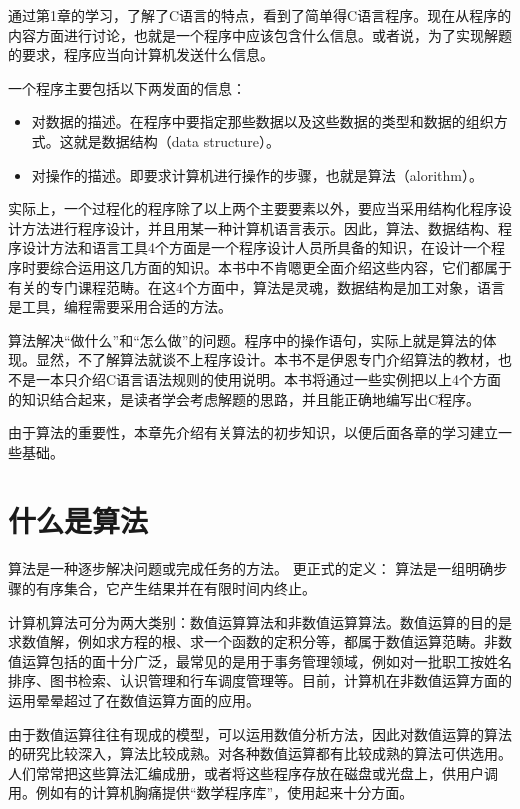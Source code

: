 \begin{lslisting}
\begin{enumerate}
通过第1章的学习，了解了C语言的特点，看到了简单得C语言程序。现在从程序的内容方面进行讨论，也就是一个程序中应该包含什么信息。或者说，为了实现解题的要求，程序应当向计算机发送什么信息。

一个程序主要包括以下两发面的信息：
\begin{itemize}
	\item 对数据的描述。在程序中要指定那些数据以及这些数据的类型和数据的组织方式。这就是数据结构（data structure）。
	\item 对操作的描述。即要求计算机进行操作的步骤，也就是算法（alorithm）。
\end{itemize}

实际上，一个过程化的程序除了以上两个主要要素以外，要应当采用结构化程序设计方法进行程序设计，并且用某一种计算机语言表示。因此，算法、数据结构、程序设计方法和语言工具4个方面是一个程序设计人员所具备的知识，在设计一个程序时要综合运用这几方面的知识。本书中不肯嗯更全面介绍这些内容，它们都属于有关的专门课程范畴。在这4个方面中，算法是灵魂，数据结构是加工对象，语言是工具，编程需要采用合适的方法。

算法解决“做什么”和“怎么做”的问题。程序中的操作语句，实际上就是算法的体现。显然，不了解算法就谈不上程序设计。本书不是伊恩专门介绍算法的教材，也不是一本只介绍C语言语法规则的使用说明。本书将通过一些实例把以上4个方面的知识结合起来，是读者学会考虑解题的思路，并且能正确地编写出C程序。

由于算法的重要性，本章先介绍有关算法的初步知识，以便后面各章的学习建立一些基础。

\section{什么是算法}

算法是一种逐步解决问题或完成任务的方法。
更正式的定义：
算法是一组明确步骤的有序集合，它产生结果并在有限时间内终止。

计算机算法可分为两大类别：数值运算算法和非数值运算算法。数值运算的目的是求数值解，例如求方程的根、求一个函数的定积分等，都属于数值运算范畴。非数值运算包括的面十分广泛，最常见的是用于事务管理领域，例如对一批职工按姓名排序、图书检索、认识管理和行车调度管理等。目前，计算机在非数值运算方面的运用晕晕超过了在数值运算方面的应用。

由于数值运算往往有现成的模型，可以运用数值分析方法，因此对数值运算的算法的研究比较深入，算法比较成熟。对各种数值运算都有比较成熟的算法可供选用。人们常常把这些算法汇编成册，或者将这些程序存放在磁盘或光盘上，供用户调用。例如有的计算机胸痛提供“数学程序库”，使用起来十分方面。


\end{enumerate}
\end{lslisting}
